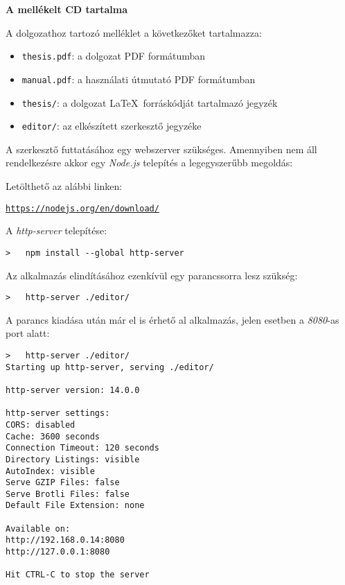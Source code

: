 \pagestyle{empty}

\noindent \textbf{\Large A mellékelt CD tartalma}

\vskip 1cm

\noindent A dolgozathoz tartozó melléklet a következőket tartalmazza:

\begin{itemize}
\item \texttt{thesis.pdf}: a dolgozat PDF formátumban
\item \texttt{manual.pdf}: a használati útmutató PDF formátumban
\item \texttt{thesis/}: a dolgozat \LaTeX\ forráskódját tartalmazó jegyzék
\item \texttt{editor/}: az elkészített szerkesztő jegyzéke
\end{itemize}

\vskip 0.5cm

\noindent
A szerkesztő futtatásához egy webszerver szükséges. Amennyiben nem áll rendelkezésre akkor egy \textit{Node.js} telepítés a legegyszerűbb megoldás:

\vskip 0.5cm
\noindent
Letölthető az alábbi linken:

\href{https://nodejs.org/en/download/}{\texttt{https://nodejs.org/en/download/}}

\vskip 0.5cm
\noindent
A \textit{http-server} telepítése:

\begin{lstlisting}[style=latex]
>   npm install --global http-server
\end{lstlisting}

\vskip 0.5cm

\noindent
Az alkalmazás elindításához ezenkívül egy parancssorra lesz szükség:

\begin{lstlisting}[style=latex]
>   http-server ./editor/
\end{lstlisting}

\vskip 0.5cm

\noindent
A parancs kiadása után már el is érhető al alkalmazás, jelen esetben a \textit{8080}-as port alatt:

\begin{lstlisting}[style=latex]
>   http-server ./editor/
Starting up http-server, serving ./editor/

http-server version: 14.0.0

http-server settings:
CORS: disabled
Cache: 3600 seconds
Connection Timeout: 120 seconds
Directory Listings: visible
AutoIndex: visible
Serve GZIP Files: false
Serve Brotli Files: false
Default File Extension: none

Available on:
http://192.168.0.14:8080
http://127.0.0.1:8080
	
Hit CTRL-C to stop the server
\end{lstlisting}
